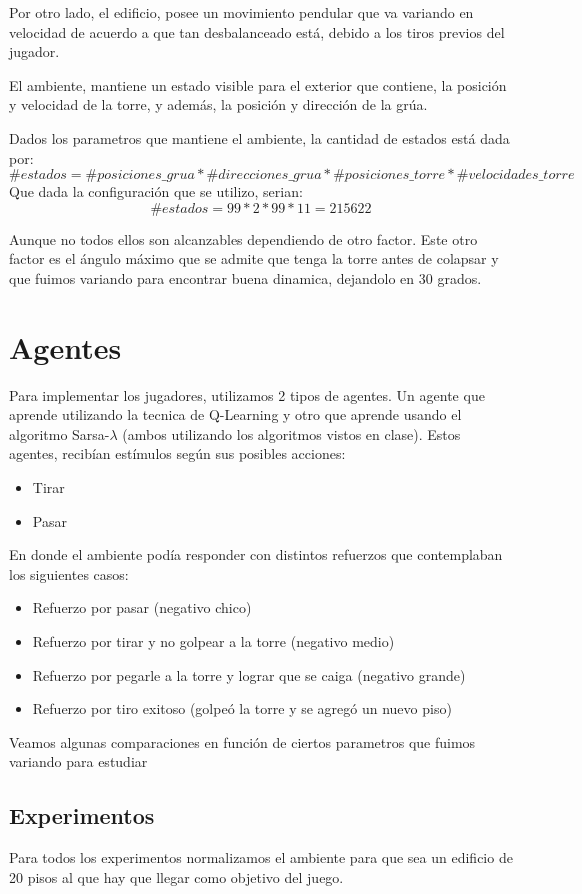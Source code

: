 \documentclass[11pt, a4paper]{article}
\newcommand{\slambda}{Sarsa-$\lambda$ }
\begin{document}
Por otro lado, el edificio, posee un movimiento pendular que va variando en velocidad de acuerdo a que tan desbalanceado est\'a, debido a los tiros previos del jugador. 

El ambiente, mantiene un estado visible para el exterior que contiene, la posici\'on y velocidad de la torre, y adem\'as, la posici\'on y direcci\'on de la gr\'ua. 

Dados los parametros que mantiene el ambiente, la cantidad de estados est\'a dada por:
$$ \#estados = \#posiciones\_grua * \#direcciones\_grua * \#posiciones\_torre *  \#velocidades\_torre  $$
Que dada la configuraci\'on que se utilizo, serian:
$$ \# estados = 99 * 2 * 99 * 11 = 215622 $$

Aunque no todos ellos son alcanzables dependiendo de otro factor. Este otro factor es el \'angulo m\'aximo que se admite que tenga la torre antes de colapsar y que fuimos variando para encontrar buena dinamica, dejandolo en 30 grados. 

\section{Agentes}
Para implementar los jugadores, utilizamos 2 tipos de agentes. Un agente que aprende utilizando la tecnica de Q-Learning y otro que aprende usando el algoritmo \slambda (ambos utilizando los algoritmos vistos en clase).
Estos agentes, recib\'ian est\'imulos seg\'un sus posibles acciones: 
\begin{itemize}
\item Tirar
\item Pasar
\end{itemize}
En donde el ambiente pod\'ia responder con distintos refuerzos que contemplaban los siguientes casos:
\begin{itemize}
\item Refuerzo por pasar (negativo chico)
\item Refuerzo por tirar y no golpear a la torre (negativo medio)
\item Refuerzo por pegarle a la torre y lograr que se caiga (negativo grande)
\item Refuerzo por tiro  exitoso (golpe\'o la torre y se agreg\'o un nuevo piso)
\end{itemize}


Veamos algunas comparaciones en funci\'on de ciertos parametros que fuimos variando para estudiar 
\subsection{Experimentos}
Para todos los experimentos normalizamos el ambiente para que sea un edificio de 20 pisos al que hay que llegar como objetivo del juego. 
\end{document}
